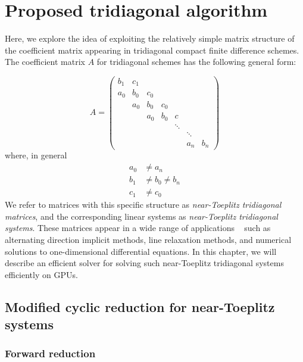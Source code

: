 \chapter{Proposed tridiagonal algorithm}

Here, we explore the idea of
exploiting the relatively simple matrix structure
of the coefficient matrix appearing in
tridiagonal compact finite difference schemes.
The coefficient matrix $A$ for tridiagonal schemes
has the following general form:

\begin{equation} \label{eqn:toeplitz-matrix}
A = 
\begin{pmatrix}
     b_1 & c_1  \\
     a_0 & b_0  &  c_0  \\
         & a_0  &  b_0 &  c_0  \\
         &      &  a_0 &  b_0 &  c    \\
         &      &      &      &  \ddots \\
         &      &      &      &     &  \ddots  \\
         &      &      &      &     &  a_n  &  b_n
\end{pmatrix}
\end{equation}
%
where, in general
\begin{align*}
    a_0 &\neq a_n  \\
    b_1 &\neq b_0 \neq b_n \\
    c_1 &\neq c_0 
\end{align*}
%
We refer to matrices with this specific structure as
\emph{near-Toeplitz tridiagonal matrices},
and the corresponding linear systems as
\emph{near-Toeplitz tridiagonal systems}.
These matrices appear in a wide range of applications
~\cite{sun1995application}
such as alternating direction implicit methods,
line relaxation methods,
and numerical solutions to one-dimensional differential equations.
In this chapter,
we will describe an efficient solver for solving such
near-Toeplitz tridiagonal systems efficiently on GPUs.

\section{Modified cyclic reduction for near-Toeplitz systems}

\subsection{Forward reduction}


